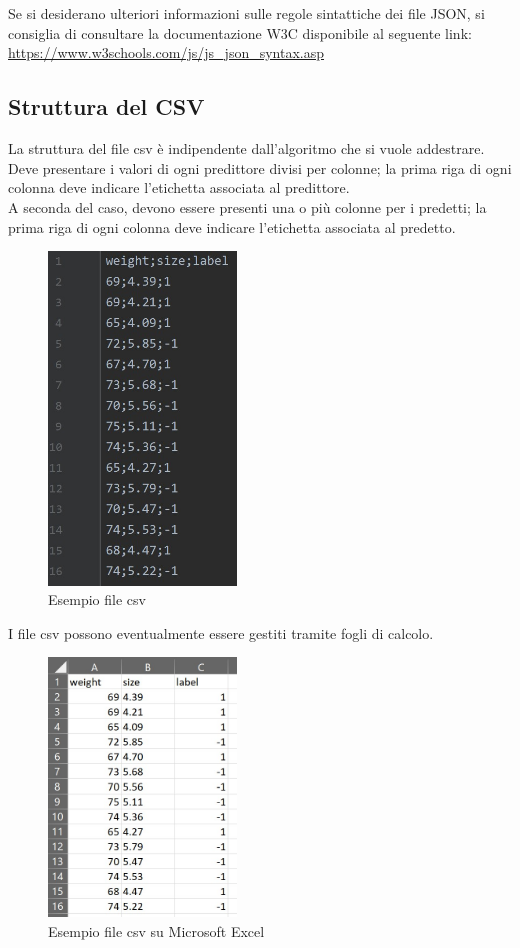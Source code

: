 		\mbox{} \\ \\ 
		Se si desiderano ulteriori informazioni sulle regole sintattiche dei file JSON, si consiglia di consultare la documentazione W3C disponibile al seguente link:
		\\[0.2cm]
		\hspace*{10mm}
		\url{https://www.w3schools.com/js/js_json_syntax.asp}
		
	\subsection{Struttura del CSV}
	La struttura del file csv è indipendente dall'algoritmo che si vuole addestrare.
	Deve presentare i valori di ogni predittore divisi per colonne; la prima riga di ogni colonna deve indicare l'etichetta associata al predittore. \\
	A seconda del caso, devono essere presenti una o più colonne per i predetti; la prima riga di ogni colonna deve indicare l'etichetta associata al predetto.
	\mbox{}
	\begin{figure} [H]
		\begin{center}
			\includegraphics[width=50mm]{./img/csv1.jpg}
		\end{center}
		\caption{Esempio file csv}
	\end{figure}
	\mbox{}
	I file csv possono eventualmente essere gestiti tramite fogli di calcolo.
	\mbox{}
	\begin{figure} [H]
		\begin{center}
			\includegraphics[width=50mm]{./img/csv2.jpg}
		\end{center}
		\caption{Esempio file csv su Microsoft Excel}
	\end{figure}
	\mbox{} 